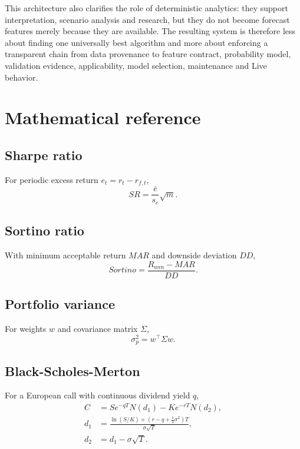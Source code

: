 \documentclass[11pt]{article}
\begin{document}
This architecture also clarifies the role of deterministic analytics: they support interpretation, scenario analysis and research, but they do not become forecast features merely because they are available. The resulting system is therefore less about finding one universally best algorithm and more about enforcing a transparent chain from data provenance to feature contract, probability model, validation evidence, applicability, model selection, maintenance and Live behavior.

\appendix
\section{Mathematical reference}
\subsection{Sharpe ratio}
For periodic excess return $e_t=r_t-r_{f,t}$,
\begin{equation}
SR=\frac{\bar e}{s_e}\sqrt{m}.
\end{equation}

\subsection{Sortino ratio}
With minimum acceptable return $MAR$ and downside deviation $DD$,
\begin{equation}
Sortino=\frac{R_{ann}-MAR}{DD}.
\end{equation}

\subsection{Portfolio variance}
For weights $w$ and covariance matrix $\Sigma$,
\begin{equation}
\sigma_p^2=w^\top\Sigma w.
\end{equation}

\subsection{Black-Scholes-Merton}
For a European call with continuous dividend yield $q$,
\begin{align}
C &= Se^{-qT}N(d_1)-Ke^{-rT}N(d_2),\\
d_1 &= \frac{\ln(S/K)+(r-q+\tfrac12\sigma^2)T}{\sigma\sqrt{T}},\\
d_2 &= d_1-\sigma\sqrt{T}.
\end{align}
\end{document}
